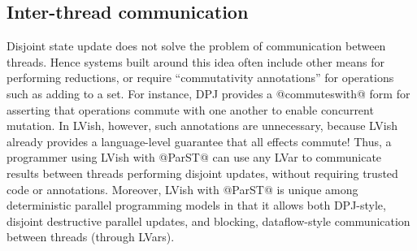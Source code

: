 \subsection{Inter-thread communication}

Disjoint state update does not solve the problem of communication
between threads.  Hence systems built around this idea often include
other means for performing reductions, or require ``commutativity
annotations'' for operations such as adding to a set.  For instance,
DPJ provides a @commuteswith@ form for asserting that operations
commute with one another to enable concurrent mutation.  In LVish,
however, such annotations are unnecessary, because LVish already
provides a language-level guarantee that all effects commute!  Thus, a
programmer using LVish with @ParST@ can use any LVar to communicate
results between threads performing disjoint updates, without requiring
trusted code or annotations.  Moreover, LVish with @ParST@ is unique
among deterministic parallel programming models in that it allows both
DPJ-style, disjoint destructive parallel updates, and blocking,
dataflow-style communication between threads (through LVars).

